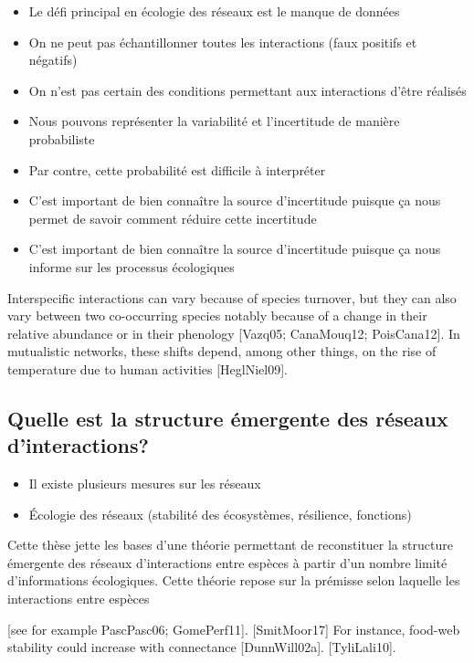 \begin{itemize}
    \item Le défi principal en écologie des réseaux est le manque de données
    \item On ne peut pas échantillonner toutes les interactions (faux positifs et négatifs)
    \item On n'est pas certain des conditions permettant aux interactions d'être réalisés
    \item Nous pouvons représenter la variabilité et l'incertitude de manière probabiliste
    \item Par contre, cette probabilité est difficile à interpréter 
    \item C'est important de bien connaître la source d'incertitude puisque ça nous permet de savoir comment réduire cette incertitude
    \item C'est important de bien connaître la source d'incertitude puisque ça nous informe sur les processus écologiques 
\end{itemize}

Interspecific interactions can vary because of species turnover, but they can
also vary between two co-occurring species notably because of a change in their
relative abundance or in their phenology [Vazq05; CanaMouq12; PoisCana12]. In
mutualistic networks, these shifts depend, among other things, on the rise of
temperature due to human activities [HeglNiel09]. 



\subsection{Quelle est la structure émergente des réseaux d'interactions?} 

\begin{itemize}
    \item Il existe plusieurs mesures sur les réseaux 
    \item Écologie des réseaux (stabilité des écosystèmes, résilience, fonctions)
\end{itemize}

Cette thèse jette les bases d'une théorie permettant de reconstituer la
structure émergente des réseaux d'interactions entre espèces à partir d'un
nombre limité d'informations écologiques. Cette théorie repose sur la prémisse
selon laquelle les interactions entre espèces 


[see for example PascPasc06;
GomePerf11].
[SmitMoor17]
For instance, food-web stability could increase with
connectance [DunnWill02a].
[TyliLali10].


